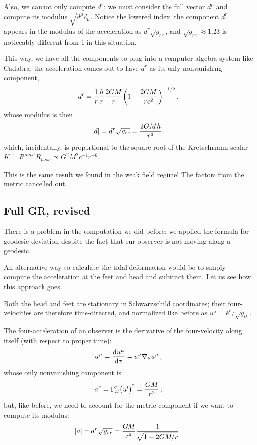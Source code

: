 \documentclass[main.tex]{subfiles}
\begin{document}
Also, we cannot only compute \(d^{r}\): we must consider the full vector \(d^{\mu }\) and compute its modulus \(\sqrt{d^{\mu } d_\mu }\). 
Notice the lowered index: the component \(d^{r}\) appears in the modulus of the acceleration as \(d^{r} \sqrt{g_{rr}}\), and \(\sqrt{g_{rr}} \approx \num{1.23}\) is noticeably different from 1 in this situation. 

This way, we have all the components to plug into a computer algebra system like Cadabra: 
the acceleration comes out to have \(d^{r}\) as its only nonvanishing component, 
%
\begin{align}
d^{r} = \frac{1}{r} \frac{h}{r} \frac{2GM}{r} \qty(1 - \frac{2GM}{rc^2})^{-1/2}
\,,
\end{align}
%
whose modulus is then 
%
\begin{align}
\abs{d} = d^{r} \sqrt{g_{rr}} = \frac{2GMh}{r^3} 
\,,
\end{align}
%
which, incidentally, is proportional to the square root of the Kretschmann scalar \(K = R^{\mu \nu \rho \sigma } R_{\mu \nu \rho \sigma } \propto G^2M^2c^{-4} r^{-6}\). 

This is the same result we found in the weak field regime! 
The factors from the metric cancelled out.

\subsection{Full GR, revised}

There is a problem in the computation we did before: we applied the formula for geodesic deviation despite the fact that our observer is not moving along a geodesic. 

An alternative way to calculate the tidal deformation would be to simply compute the acceleration at the feet and head and subtract them. 
Let us see how this approach goes. 

Both the head and feet are stationary in Schwarzschild coordinates; their four-velocities are therefore time-directed, and normalized like before as \(u^{\mu } = \hat{e}^{t} / \sqrt{g_{tt}}\).

The four-acceleration of an observer is the derivative of the four-velocity along itself (with respect to proper time): 
%
\begin{align}
a^{\mu } = \dv{u^{\mu }}{\tau } = u^{\nu } \nabla_{\nu } u^{\mu } 
\,,
\end{align}
%
whose only nonvanishing component is 
%
\begin{align}
a^{r} = \Gamma^{r}_{tt} \qty( u^{t})^2 = \frac{GM}{r^2}
\,,
\end{align}
%
but, like before, we need to account for the metric component if we want to compute its modulus: 
%
\begin{align}
\abs{a} = a^{r} \sqrt{ g_{rr}} = \frac{GM}{r^2} \frac{1}{\sqrt{1 - 2GM / r}}
\,.
\end{align}
\end{document}
